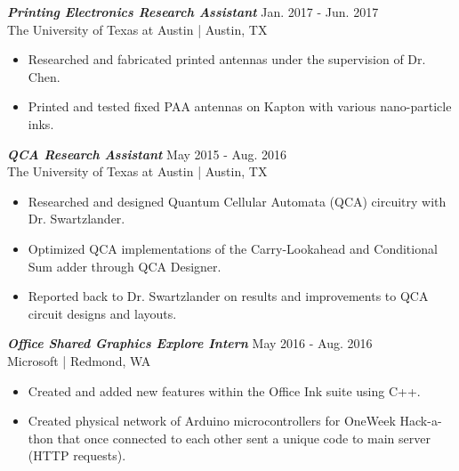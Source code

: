 \documentclass[letter]{res}
\begin{document}
\begin{resume}
\vspace{-2mm}

{\sl \textbf{Printing Electronics Research Assistant}} \hfill Jan. 2017 - Jun. 2017\\
The University of Texas at Austin | Austin, TX \newline

 \vspace{-4mm}

 \begin{itemize}
 \item Researched and fabricated printed antennas under the supervision of Dr. Chen.
 \item Printed and tested fixed PAA antennas on Kapton with various nano-particle inks.
 \end{itemize}
 
\vspace{-2mm}

{\sl \textbf{QCA Research Assistant}} \hfill May 2015 - Aug. 2016\\
The University of Texas at Austin | Austin, TX \newline

 \vspace{-4mm}

 \begin{itemize}
 \item Researched and designed Quantum Cellular Automata (QCA) circuitry with Dr. Swartzlander.
 \item Optimized QCA implementations of the Carry-Lookahead and Conditional Sum adder through QCA Designer.
 \item Reported back to Dr. Swartzlander on results and improvements to QCA circuit designs and layouts.
 \end{itemize}
 
\vspace{-2mm}
   
{\sl \textbf{Office Shared Graphics Explore Intern}} \hfill May 2016 - Aug. 2016\\
Microsoft | Redmond, WA \newline
 \vspace{-4mm}
  \begin{itemize}
  \item Created and added new features within the Office Ink suite using C++.
  \item Created physical network of Arduino microcontrollers for OneWeek Hack-a-thon that once connected to each other sent a unique code to main server (HTTP requests).
  \end{itemize}
  

\end{resume}
\end{document}
